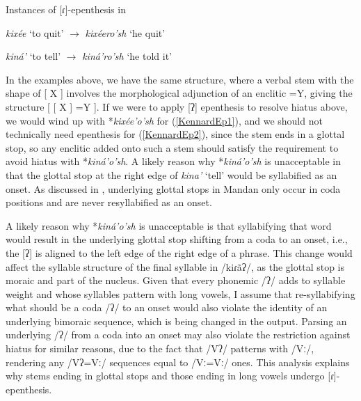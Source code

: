 \begin{exe}

\item\label{KennardEp} Instances of [ɾ]-epenthesis in \citet[17]{kennard1936}

\begin{xlist}

\item\label{KennardEp1} \textit{kixée} `to quit' $\to$ \textit{kixéero'sh} `he quit'

\item\label{KennardEp2} \textit{kiná'} `to tell' $\to$ \textit{kiná'ro'sh} `he told it'

\end{xlist}

\end{exe}

In the examples above, we have the same structure, where a verbal stem with the shape of [ X ] involves the morphological adjunction of an enclitic =Y, giving the structure [ [ X ] =Y ]. If we were to apply [ʔ] epenthesis to resolve hiatus above, we would wind up with *\textit{kixée'o'sh} for (\ref{KennardEp1}), and  we should not technically need epenthesis for (\ref{KennardEp2}), since the stem ends in a glottal stop, so any enclitic added onto such a stem should satisfy the requirement to avoid hiatus with *\textit{kiná'o'sh}. A likely reason why *\textit{kiná'o'sh} is unacceptable in that the glottal stop at the right edge of \textit{kina'} `tell' would be syllabified as an onset. As discussed in , underlying glottal stops in Mandan only occur in coda positions and are never resyllabified as an onset.

A likely reason why *\textit{kiná'o'sh} is unacceptable is that syllabifying that word would result in the underlying glottal stop shifting from a coda to an onset, i.e., the [ʔ] is aligned to the left edge of the right edge of a phrase. This change would affect the syllable structure of the final syllable in /kiɾãʔ/, as the glottal stop is moraic and part of the nucleus. Given that every phonemic /ʔ/ adds to syllable weight and whose syllables pattern with long vowels, I assume that re-syllabifying what should be a coda /ʔ/ to an onset would also violate the identity of an underlying bimoraic sequence, which is being changed in the output. Parsing an underlying /ʔ/ from a coda into an onset may also violate the restriction against hiatus for similar reasons, due to the fact that /Vʔ/ patterns with /Vː/, rendering any /Vʔ=Vː/ sequences equal to /Vː=Vː/ ones. This analysis explains why stems ending in glottal stops and those ending in long vowels undergo [ɾ]-epenthesis.

